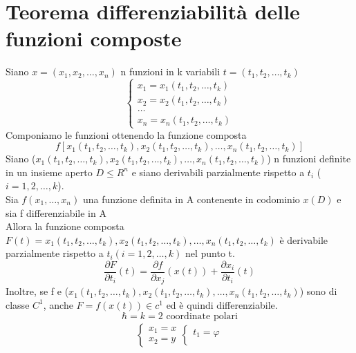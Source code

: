 \section{Teorema differenziabilità delle funzioni composte}
\begin{teorema}
	Siano $x=(x_1,x_2,\dots,x_n)$ n funzioni in k variabili
	$t=(t_1,t_2,\dots,t_k)$
	\begin{equation}
		\begin{cases}
			x_1=x_1(t_1,t_2,\dots,t_k)\\
			x_2=x_2(t_1,t_2,\dots,t_k)\\
			\dots\\
			x_n=x_n(t_1,t_2,\dots,t_k)
		\end{cases}
	\end{equation}
	Componiamo le funzioni ottenendo la funzione composta
	\begin{equation*}
		f[x_1(t_1,t_2,\dots,t_k), x_2(t_1,t_2,\dots,t_k), \dots,
		x_n(t_1,t_2,\dots,t_k)]
	\end{equation*}
	Siano ($x_1(t_1,t_2,\dots,t_k), x_2(t_1,t_2,\dots,t_k), \dots,
		x_n(t_1,t_2,\dots,t_k)$) n funzioni definite in un insieme aperto
		$D\leq R^n$ e siano derivabili parzialmente rispetto a $t_i$
		($i=1,2,\dots, k$).\\
		Sia $f(x_1,\dots,x_n)$ una funzione definita in A contenente in
		codominio $x(D)$ e sia f differenziabile in A\\
	Allora la funzione composta $F(t)=x_1(t_1,t_2,\dots,t_k), x_2(t_1,t_2, 
		\dots,t_k), \dots, x_n(t_1,t_2,\dots,t_k)$ è derivabile parzialmente
		rispetto a $t_i(i=1,2,\dots,k)$ nel punto t.
		\begin{equation*}
			\frac{\partial F}{\partial t_i} (t)=\frac{\partial f}{\partial
			x_j}(x(t))+\frac{\partial x_i}{\partial t_i}(t) 
		\end{equation*}
		Inoltre, se f e ($x_1(t_1,t_2,\dots,t_k), x_2(t_1,t_2,\dots,t_k), \dots,
		x_n(t_1,t_2,\dots,t_k)$) sono di classe $C^1$, anche $F=f(x(t))\in c^1$
		ed è quindi differenziabile.
		\begin{equation*}
			\hbar=k=2 \text{ coordinate polari}
		\end{equation*}
		\begin{equation*}
			\begin{matrix}
				\begin{cases}
					x_1=x\\
					x_2=y
				\end{cases}
				\begin{cases}
					t_1=\varphi\\

\end{cases}
\end{matrix}
\end{equation*}
\end{teorema}
